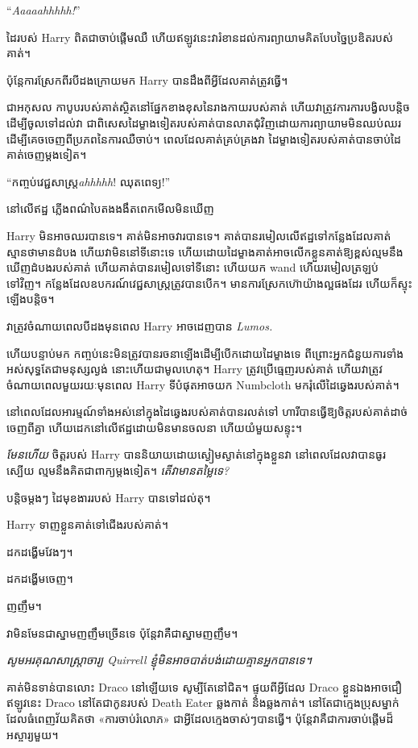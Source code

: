 {{{{{{“\emph{Aaaaahhhhh!}”

ដៃ​របស់ Harry ពិត​ជា​ចាប់​ផ្ដើម​ឈឺ ហើយ​ឥឡូវ​នេះ​វា​រំខាន​ដល់​ការ​ព្យាយាម​គិត​បែប​ច្នៃ​ប្រឌិត​របស់​គាត់។

ប៉ុន្តែការស្រែកពីរបីដងក្រោយមក Harry បានដឹងពីអ្វីដែលគាត់ត្រូវធ្វើ។

ជាអកុសល កាបូបរបស់គាត់ស្ថិតនៅផ្នែកខាងខុសនៃរាងកាយរបស់គាត់ ហើយវាត្រូវការការបង្វិលបន្តិចដើម្បីចូលទៅដល់វា ជាពិសេសដៃម្ខាងទៀតរបស់គាត់បានលាតជុំវិញដោយការព្យាយាមមិនឈប់ឈរ ដើម្បីគេចចេញពីប្រភពនៃការឈឺចាប់។ ពេល​ដែល​គាត់​គ្រប់គ្រង​វា ដៃ​ម្ខាង​ទៀត​របស់​គាត់​បាន​ចាប់​ដៃ​គាត់​ចេញ​ម្ដង​ទៀត។

“កញ្ចប់វេជ្ជសាស្ត្រ\emph{ahhhhh}! ឈុតពេទ្យ!”

នៅ​លើ​ឥដ្ឋ ភ្លើង​ពណ៌​បៃតង​ងងឹត​ពេក​មើល​មិន​ឃើញ

Harry មិនអាចឈរបានទេ។ គាត់មិនអាចវារបានទេ។ គាត់បានរមៀលលើឥដ្ឋទៅកន្លែងដែលគាត់ស្មានថាមានដំបង ហើយវាមិននៅទីនោះទេ ហើយដោយដៃម្ខាងគាត់អាចលើកខ្លួនគាត់ឱ្យខ្ពស់ល្មមនឹងឃើញដំបងរបស់គាត់ ហើយគាត់បានរមៀលទៅទីនោះ ហើយយក wand ហើយរមៀលត្រឡប់ទៅវិញ។ កន្លែងដែលឧបករណ៍វេជ្ជសាស្ត្រត្រូវបានបើក។ មាន​ការ​ស្រែក​ហ៊ោ​យ៉ាង​ល្អ​ផង​ដែរ ហើយ​ក៏​ស្ទុះ​ឡើង​បន្តិច។

វា​ត្រូវ​ចំណាយ​ពេល​បី​ដង​មុន​ពេល Harry អាច​ដេញ​បាន \emph{Lumos.}

ហើយបន្ទាប់មក កញ្ចប់នេះមិនត្រូវបានរចនាឡើងដើម្បីបើកដោយដៃម្ខាងទេ ពីព្រោះអ្នកជំនួយការទាំងអស់សុទ្ធតែជាមនុស្សល្ងង់ នោះហើយជាមូលហេតុ។ Harry ត្រូវ​ប្រើ​ធ្មេញ​របស់​គាត់ ហើយ​វា​ត្រូវ​ចំណាយ​ពេល​មួយ​រយៈ​មុន​ពេល Harry ទីបំផុត​អាច​យក Numbcloth មក​រុំ​លើ​ដៃ​ឆ្វេង​របស់​គាត់។

នៅពេលដែលអារម្មណ៍ទាំងអស់នៅក្នុងដៃឆ្វេងរបស់គាត់បានរលត់ទៅ ហារីបានធ្វើឱ្យចិត្តរបស់គាត់ដាច់ចេញពីគ្នា ហើយដេកនៅលើឥដ្ឋដោយមិនមានចលនា ហើយយំមួយសន្ទុះ។

\emph{មែនហើយ} ចិត្តរបស់ Harry បាននិយាយដោយស្ងៀមស្ងាត់នៅក្នុងខ្លួនវា នៅពេលដែលវាបានធូរស្បើយ ល្មមនឹងគិតជាពាក្យម្តងទៀត។ \emph{តើវាមានតម្លៃទេ?}

បន្តិចម្ដងៗ ដៃមុខងាររបស់ Harry បានទៅដល់តុ។

Harry ទាញខ្លួនគាត់ទៅជើងរបស់គាត់។

ដកដង្ហើមវែងៗ។

ដកដង្ហើមចេញ។

ញញឹម។

វាមិនមែនជាស្នាមញញឹមច្រើនទេ ប៉ុន្តែវាគឺជាស្នាមញញឹម។

\emph{សូមអរគុណសាស្រ្តាចារ្យ Quirrell ខ្ញុំមិនអាចបាត់បង់ដោយគ្មានអ្នកបានទេ។}

គាត់មិនទាន់បានលោះ Draco នៅឡើយទេ សូម្បីតែនៅជិត។ ផ្ទុយពីអ្វីដែល Draco ខ្លួនឯងអាចជឿឥឡូវនេះ Draco នៅតែជាកូនរបស់ Death Eater ឆ្លងកាត់ និងឆ្លងកាត់។ នៅ​តែ​ជា​ក្មេង​ប្រុស​ម្នាក់​ដែល​ធំ​ពេញ​វ័យ​គិត​ថា «ការ​ចាប់​រំលោភ» ជា​អ្វី​ដែល​ក្មេង​ចាស់​ៗ​បាន​ធ្វើ។ ប៉ុន្តែវាគឺជាការចាប់ផ្តើមដ៏អស្ចារ្យមួយ។

}}}}}}
